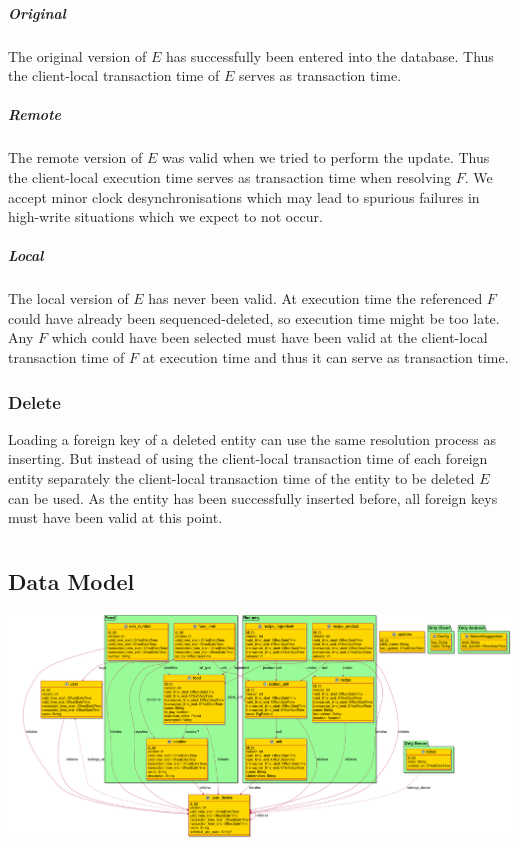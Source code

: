 \documentclass{memoir}
\begin{document}
\paragraph{Original} The original version of $E$ has successfully been entered into the database. Thus the client-local transaction time of $E$ serves as transaction time.

\paragraph{Remote} The remote version of $E$ was valid when we tried to perform the update. Thus the client-local execution time serves as transaction time when resolving $F$. We accept minor clock desynchronisations which may lead to spurious failures in high-write situations which we expect to not occur.

\paragraph{Local} The local version of $E$ has never been valid. At execution time the referenced $F$ could have already been sequenced-deleted, so execution time might be too late. Any $F$ which could have been selected must have been valid at the client-local transaction time of $F$ at execution time and thus it can serve as transaction time.

\subsection{Delete}

Loading a foreign key of a deleted entity can use the same resolution process as inserting. But instead of using the client-local transaction time of each foreign entity separately the client-local transaction time of the entity to be deleted $E$ can be used. As the entity has been successfully inserted before, all foreign keys must have been valid at this point.

\chapter{}
\section{Data Model}

\includegraphics[width=1.25\linewidth]{diagrams/data-model.png}
\end{document}
